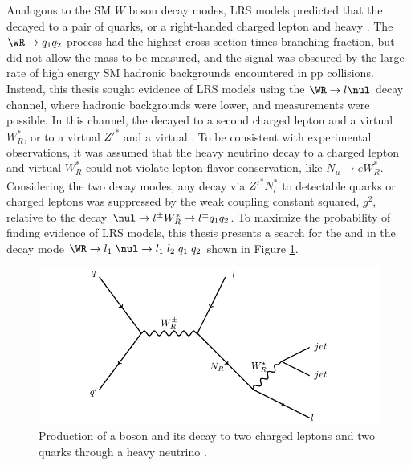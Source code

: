 Analogous to the SM $W$ boson decay modes, LRS models predicted that the \WR 
decayed to a pair of quarks, or a right-handed charged lepton and heavy \nul.  The $\WR \rightarrow q_{1}q_{2}$ 
process had the highest cross section times branching fraction, but did not allow the mass 
\mnul to be measured, and the \WR signal was obscured by the large rate of high energy SM hadronic 
backgrounds encountered in pp collisions.  Instead, this thesis sought evidence of LRS models using 
the $\WR \rightarrow l\nul$ decay channel, where hadronic backgrounds were lower, and \mnul measurements 
were possible.  In this channel, the \nul decayed to a second charged 
lepton and a virtual $W^{*}_{R}$, or to a virtual $Z'^{*}$ and a virtual \nul.  To 
be consistent with experimental observations, it was assumed that the heavy neutrino decay to a charged lepton and 
virtual $W^{*}_{R}$ could not violate lepton flavor conservation, like $N_{\mu} \rightarrow eW^{*}_{R}$.  
Considering the two \nul decay modes, any \nul decay via $Z'^{*}N^{*}_{l}$ to detectable quarks or 
charged leptons was suppressed by the weak coupling constant squared, $g^{2}$, relative to 
the decay $\nul \rightarrow l^{\pm}W^{*}_{R} \rightarrow l^{\pm}q_{1}q_{2}$.  To maximize 
the probability of finding evidence of LRS models, this thesis presents a search 
for the \WR and \nul in the decay mode $\WR \rightarrow l_{1}\thickspace \nul \rightarrow 
l_{1}\thickspace l_{2}\thickspace q_{1}\thickspace q_{2}$ shown in Figure \ref{fig:wrFeynmanDiagram}.


\begin{figure}[h]
	\centering
	\includegraphics[width=1.0\textwidth]{figures/feynman.pdf}
	\caption{Production of a \WR boson and its decay to two charged leptons and two quarks through 
	a heavy neutrino \nul.}
	\label{fig:wrFeynmanDiagram}
\end{figure}

